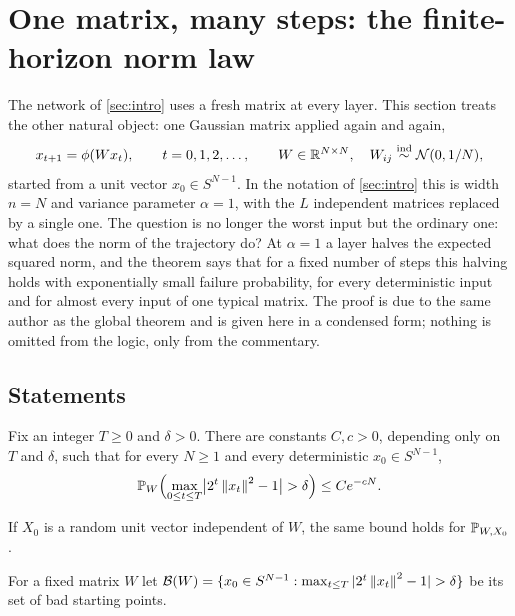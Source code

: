 \section{One matrix, many steps: the finite-horizon norm law}
\label{sec:horizon}

The network of \cref{sec:intro} uses a fresh matrix at every layer. This section treats the other natural object: one Gaussian matrix applied again and again,
\begin{equation}\label{eq:fh-dyn}
x_{t+1}=\phi(Wx_t),\qquad t=0,1,2,\dots,\qquad W\in\mathbb{R}^{N\times N},\quad W_{ij}\overset{\text{ind}}{\sim}\mathcal N(0,1/N),
\end{equation}
started from a unit vector $x_0\in S^{N-1}$. In the notation of \cref{sec:intro} this is width $n=N$ and variance parameter $\alpha=1$, with the $L$ independent matrices replaced by a single one. The question is no longer the worst input but the ordinary one: what does the norm of the trajectory do? At $\alpha=1$ a layer halves the expected squared norm, and the theorem says that for a fixed number of steps this halving holds with exponentially small failure probability, for every deterministic input and for almost every input of one typical matrix. The proof is due to the same author as the global theorem and is given here in a condensed form; nothing is omitted from the logic, only from the commentary.

\subsection{Statements}

\begin{theorem}\label{thm:fh}
Fix an integer $T\ge0$ and $\delta>0$. There are constants $C,c>0$, depending only on $T$ and $\delta$, such that for every $N\ge1$ and every deterministic $x_0\in S^{N-1}$,
\begin{equation}\label{eq:fh-main}
\PP_W\Bigl(\max_{0\le t\le T}\bigl|2^t\norm{x_t}^2-1\bigr|>\delta\Bigr)\le Ce^{-cN}.
\end{equation}
\end{theorem}

\begin{corollary}\label{cor:fh-random}
If $X_0$ is a random unit vector independent of $W$, the same bound holds for $\mathbb{P}_{W,X_0}$.
\end{corollary}

For a fixed matrix $W$ let $\mathcal B(W)=\{x_0\in S^{N-1}:\max_{t\le T}|2^t\norm{x_t}^2-1|>\delta\}$ be its set of bad starting points.

